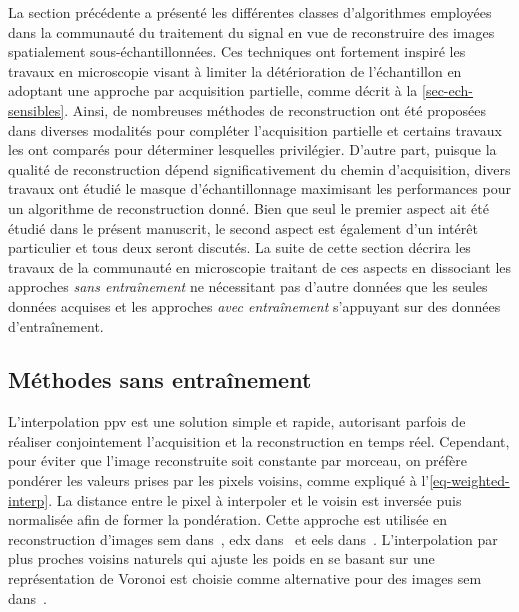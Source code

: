 La section précédente a présenté les différentes classes d'algorithmes employées dans la communauté du traitement du signal en vue de reconstruire des images spatialement sous-échantillonnées. Ces techniques ont fortement inspiré les travaux en microscopie visant à limiter la détérioration de l'échantillon en adoptant une approche par acquisition partielle, comme décrit à la \cref{sec-ech-sensibles}.
%
Ainsi, de nombreuses méthodes de reconstruction ont été proposées dans diverses modalités pour compléter l'acquisition partielle et certains travaux les ont comparés pour déterminer lesquelles privilégier.
%
D'autre part, puisque la qualité de reconstruction dépend significativement du chemin d'acquisition, divers travaux ont étudié le masque d'échantillonnage maximisant les performances pour un algorithme de reconstruction donné. Bien que seul le premier aspect ait été étudié dans le présent manuscrit, le second aspect est également d'un intérêt particulier et tous deux seront discutés.
%
La suite de cette section décrira les travaux de la communauté en microscopie traitant de ces aspects en dissociant les approches \emph{sans entraînement} ne nécessitant pas d'autre données que les seules données acquises et les approches \emph{avec entraînement} s'appuyant sur des données d'entraînement.

\subsection{Méthodes sans entraînement}

L'interpolation \gls{ppv} est une solution simple et rapide, autorisant parfois de réaliser conjointement l'acquisition et la reconstruction en temps réel. Cependant, pour éviter que l'image reconstruite soit constante par morceau, on préfère pondérer les valeurs prises par les pixels voisins, comme expliqué à l'\cref{eq-weighted-interp}. La distance entre le pixel à interpoler et le voisin est inversée puis normalisée afin de former la pondération. Cette approche est utilisée en reconstruction d'images \gls{sem} dans~\cite{godaliyadda2018tci}, \gls{edx} dans~\cite{zhang2018reduced, hujsak2018high} et \gls{eels} dans~\cite{hujsak2018high}. L'interpolation par plus proches voisins naturels qui ajuste les poids en se basant sur une représentation de Voronoi est choisie comme alternative pour des images \gls{sem} dans~\cite{trampert2018ultramicroscopy}.

